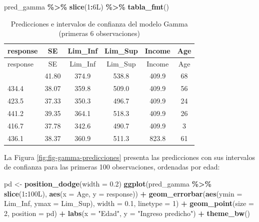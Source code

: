 \documentclass[
  spanish,
  12pt,
]{book}
\newenvironment{Shaded}{\begin{snugshade}}{\end{snugshade}}
\newcommand{\AttributeTok}[1]{\textcolor[rgb]{0.13,0.29,0.53}{#1}}
\newcommand{\DataTypeTok}[1]{\textcolor[rgb]{0.13,0.29,0.53}{#1}}
\newcommand{\DecValTok}[1]{\textcolor[rgb]{0.00,0.00,0.81}{#1}}
\newcommand{\FloatTok}[1]{\textcolor[rgb]{0.00,0.00,0.81}{#1}}
\newcommand{\FunctionTok}[1]{\textcolor[rgb]{0.13,0.29,0.53}{\textbf{#1}}}
\newcommand{\NormalTok}[1]{#1}
\newcommand{\OtherTok}[1]{\textcolor[rgb]{0.56,0.35,0.01}{#1}}
\newcommand{\SpecialCharTok}[1]{\textcolor[rgb]{0.81,0.36,0.00}{\textbf{#1}}}
\newcommand{\StringTok}[1]{\textcolor[rgb]{0.31,0.60,0.02}{#1}}
\begin{document}
\begin{Shaded}
\begin{Highlighting}[]
\NormalTok{pred\_gamma }\SpecialCharTok{\%\textgreater{}\%} \FunctionTok{slice}\NormalTok{(}\DecValTok{1}\SpecialCharTok{:}\DecValTok{6}\DataTypeTok{L}\NormalTok{) }\SpecialCharTok{\%\textgreater{}\%} \FunctionTok{tabla\_fmt}\NormalTok{()}
\end{Highlighting}
\end{Shaded}

\begin{longtable}[]{@{}lccccc@{}}
\caption{\label{tab:tab-gamma-predicciones}Predicciones e intervalos de confianza del modelo Gamma (primeras 6 observaciones)}\tabularnewline
\toprule\noalign{}
response & SE & Lim\_Inf & Lim\_Sup & Income & Age \\
\midrule\noalign{}
\endfirsthead
\toprule\noalign{}
response & SE & Lim\_Inf & Lim\_Sup & Income & Age \\
\midrule\noalign{}
\endhead
\bottomrule\noalign{}
\endlastfoot
456.8 & 41.80 & 374.9 & 538.8 & 409.9 & 68 \\
434.4 & 38.07 & 359.8 & 509.0 & 409.9 & 56 \\
423.5 & 37.33 & 350.3 & 496.7 & 409.9 & 24 \\
441.2 & 39.35 & 364.1 & 518.3 & 409.9 & 26 \\
416.7 & 37.78 & 342.6 & 490.7 & 409.9 & 3 \\
436.1 & 38.37 & 360.9 & 511.3 & 823.8 & 61 \\
\end{longtable}

La Figura \ref{fig:fig-gamma-predicciones} presenta las predicciones con sus intervalos de confianza para las primeras 100 observaciones, ordenadas por edad:

\begin{Shaded}
\begin{Highlighting}[]
\NormalTok{pd }\OtherTok{\textless{}{-}} \FunctionTok{position\_dodge}\NormalTok{(}\AttributeTok{width =} \FloatTok{0.2}\NormalTok{)}
\FunctionTok{ggplot}\NormalTok{(pred\_gamma }\SpecialCharTok{\%\textgreater{}\%} \FunctionTok{slice}\NormalTok{(}\DecValTok{1}\SpecialCharTok{:}\DecValTok{100}\DataTypeTok{L}\NormalTok{),}
       \FunctionTok{aes}\NormalTok{(}\AttributeTok{x =}\NormalTok{ Age, }\AttributeTok{y =}\NormalTok{ response)) }\SpecialCharTok{+}
  \FunctionTok{geom\_errorbar}\NormalTok{(}\FunctionTok{aes}\NormalTok{(}\AttributeTok{ymin =}\NormalTok{ Lim\_Inf, }\AttributeTok{ymax =}\NormalTok{ Lim\_Sup),}
                \AttributeTok{width =} \FloatTok{0.1}\NormalTok{, }\AttributeTok{linetype =} \DecValTok{1}\NormalTok{) }\SpecialCharTok{+}
  \FunctionTok{geom\_point}\NormalTok{(}\AttributeTok{size =} \DecValTok{2}\NormalTok{, }\AttributeTok{position =}\NormalTok{ pd) }\SpecialCharTok{+}
  \FunctionTok{labs}\NormalTok{(}\AttributeTok{x =} \StringTok{"Edad"}\NormalTok{, }\AttributeTok{y =} \StringTok{"Ingreso predicho"}\NormalTok{) }\SpecialCharTok{+}
  \FunctionTok{theme\_bw}\NormalTok{()}
\end{Highlighting}
\end{Shaded}
\end{document}
